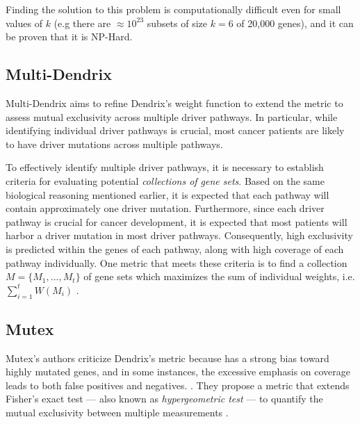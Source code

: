 Finding the solution to this problem is computationally difficult even for small values of $k$ (e.g there are $\approx 10^{23}$ subsets of size $k = 6$ of 20,000 genes), and it can be proven that it is NP-Hard. 

\subsection{Multi-Dendrix}

Multi-Dendrix aims to refine Dendrix's weight function to extend the metric to assess mutual exclusivity across multiple driver pathways. In particular, while identifying individual driver pathways is crucial, most cancer patients are likely to have driver mutations across multiple pathways.

To effectively identify multiple driver pathways, it is necessary to establish criteria for evaluating potential \textit{collections of gene sets}. Based on the same biological reasoning mentioned earlier, it is expected that each pathway will contain approximately one driver mutation. Furthermore, since each driver pathway is crucial for cancer development, it is expected that most patients will harbor a driver mutation in most driver pathways. Consequently, high exclusivity is predicted within the genes of each pathway, along with high coverage of each pathway individually. One metric that meets these criteria is to find a collection $M = \{M_1, \ldots, M_t\}$ of gene sets which maximizes the sum of individual weights, i.e. $\sum_{i = 1}^t {W(M_i)}$ \cite{multi-dendrix}.

\subsection{Mutex}

Mutex's authors  criticize Dendrix's metric because has a strong bias toward highly mutated genes, and in some instances, the excessive emphasis on coverage leads to both false positives and negatives. . They propose a metric that extends Fisher's exact test --- also known as \textit{hypergeometric test} --- to quantify the mutual exclusivity between multiple measurements \cite{mutex}.


